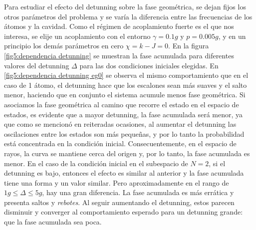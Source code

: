 Para estudiar el efecto del detunning sobre la fase geométrica, se dejan fijos los otros parámetros del problema y se varía la diferencia entre las frecuencias de los átomos y la cavidad. Como el régimen de acoplamiento fuerte es el que nos interesa, se elije un acoplamiento con el entorno $\gamma=0.1g$ y $p=0.005g$, y en un principio los demás parámetros en cero $\chi=k-J=0$. En la figura \ref{fig5:dependencia detunning} se muestran la fase acumulada para diferentes valores del detunning $\Delta$ para las dos condiciones iniciales elegidas. En \ref{fig5:dependencia detunning eg0} se observa el mismo comportamiento que en el caso de 1 átomo, el detunning hace que los escalones sean más suaves y el salto menor, haciendo que en conjunto el sistema acumule menos fase geométrica. Si asociamos la fase geométrica al camino que recorre el estado en el espacio de estados, es evidente que a mayor detunning, la fase acumulada será menor, ya que como se mencionó en reiteradas ocasiones, al aumentar el detunning las oscilaciones entre los estados son más pequeñas, y por lo tanto la probabilidad está concentrada en la condición inicial. Consecuentemente, en el espacio de rayos, la curva se mantiene cerca del origen y, por lo tanto, la fase acumulada es menor. En el caso de la condición inicial en el subespacio de $N=2$, si el detunning es bajo, entonces el efecto es similar al anterior y la fase acumulada tiene una forma y un valor similar. Pero aproximadamente en el rango de $1g \leq \Delta \leq 5g$, hay una gran diferencia. La fase acumulada es más errática y presenta saltos y \textit{rebotes}. Al seguir aumentando el detunning, estos parecen disminuir y converger al comportamiento esperado para un detunning grande: que la fase acumulada sea poca.
